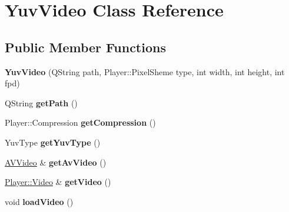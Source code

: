 \hypertarget{classYuvVideo}{}\section{Yuv\+Video Class Reference}
\label{classYuvVideo}
\subsection*{Public Member Functions}
\begin{DoxyCompactItemize}
\item 
\hypertarget{classYuvVideo_af7b99189afc20c864ca21790f9c545e3}{}{\bfseries Yuv\+Video} (Q\+String path, Player\+::\+Pixel\+Sheme type, int width, int height, int fpd)\label{classYuvVideo_af7b99189afc20c864ca21790f9c545e3}

\item 
\hypertarget{classYuvVideo_a1a94d0c9bf9dd725556721ac914025e3}{}Q\+String {\bfseries get\+Path} ()\label{classYuvVideo_a1a94d0c9bf9dd725556721ac914025e3}

\item 
\hypertarget{classYuvVideo_a12927ed197c467bc2c804a80caee6305}{}Player\+::\+Compression {\bfseries get\+Compression} ()\label{classYuvVideo_a12927ed197c467bc2c804a80caee6305}

\item 
\hypertarget{classYuvVideo_aded650e8b9796ea86dc24a9b75b3a8ec}{}Yuv\+Type {\bfseries get\+Yuv\+Type} ()\label{classYuvVideo_aded650e8b9796ea86dc24a9b75b3a8ec}

\item 
\hypertarget{classYuvVideo_a80b45e8ca2b2ebcc550b2416e5040ed8}{}\hyperlink{classAVVideo}{A\+V\+Video} \& {\bfseries get\+Av\+Video} ()\label{classYuvVideo_a80b45e8ca2b2ebcc550b2416e5040ed8}

\item 
\hypertarget{classYuvVideo_ada3059b0113937e0393f1f4a26525abb}{}\hyperlink{classPlayer_1_1Video}{Player\+::\+Video} \& {\bfseries get\+Video} ()\label{classYuvVideo_ada3059b0113937e0393f1f4a26525abb}

\item 
\hypertarget{classYuvVideo_a220f0cb424996d91cbe098b02c484bb0}{}void {\bfseries load\+Video} ()\label{classYuvVideo_a220f0cb424996d91cbe098b02c484bb0}

\end{DoxyCompactItemize}

